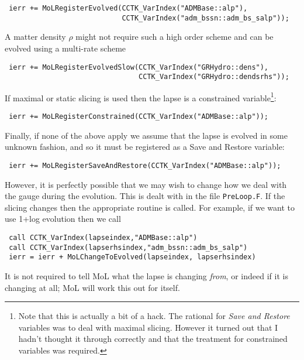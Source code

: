 \begin{verbatim}
 ierr += MoLRegisterEvolved(CCTK_VarIndex("ADMBase::alp"),
                            CCTK_VarIndex("adm_bssn::adm_bs_salp")); 
\end{verbatim}

\noindent A matter density $\rho$ might not require such a high order scheme
and can be evolved using a multi-rate scheme

\begin{verbatim}
 ierr += MoLRegisterEvolvedSlow(CCTK_VarIndex("GRHydro::dens"),
                                CCTK_VarIndex("GRHydro::dendsrhs")); 
\end{verbatim}

\noindent If maximal or static slicing is used then the lapse is a
constrained variable\footnote{Note that this is actually a bit of a
  hack. The rational for {\it Save and Restore} variables was to deal
  with maximal slicing. However it turned out that I hadn't thought it
  through correctly and that the treatment for constrained variables
  was required.}:

\begin{verbatim}
 ierr += MoLRegisterConstrained(CCTK_VarIndex("ADMBase::alp"));
\end{verbatim}

\noindent Finally, if none of the above apply we assume that the lapse
is evolved in some unknown fashion, and so it must be registered as a
Save and Restore variable:

\begin{verbatim}
 ierr += MoLRegisterSaveAndRestore(CCTK_VarIndex("ADMBase::alp"));
\end{verbatim}

However, it is perfectly possible that we may wish to change how we
deal with the gauge during the evolution. This is dealt with in the
file {\tt PreLoop.F}. If the slicing changes then the appropriate
routine is called. For example, if we want to use 1+log evolution then
we call 

\begin{verbatim}
 call CCTK_VarIndex(lapseindex,"ADMBase::alp")
 call CCTK_VarIndex(lapserhsindex,"adm_bssn::adm_bs_salp")
 ierr = ierr + MoLChangeToEvolved(lapseindex, lapserhsindex)
\end{verbatim}

\noindent It is not required to tell MoL what the lapse is changing
{\it from}, or indeed if it is changing at all; MoL will work this out
for itself.

